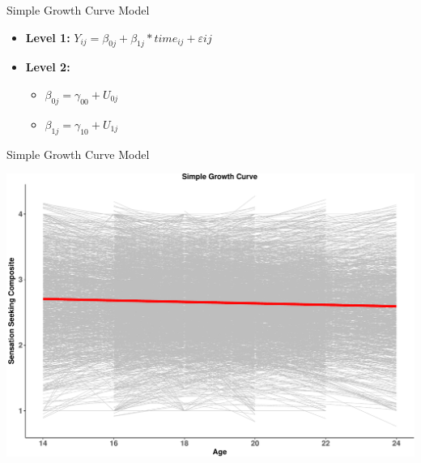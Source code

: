 \documentclass[ignorenonframetext,]{beamer}
\begin{document}
\begin{frame}{Simple Growth Curve Model}

\begin{itemize}
  \item \textbf{Level 1:} $Y_{ij} = \beta_{0j} + \beta_{1j}*time_{ij} + \varepsilon{ij}$
  \item \textbf{Level 2:} 
    \begin{itemize} 
      \item $\beta_{0j} = \gamma_{00} + U_{0j}$
      \item $\beta_{1j} = \gamma_{10} + U_{1j}$
    \end{itemize}
\end{itemize}

\end{frame}

\begin{frame}{Simple Growth Curve Model}

\includegraphics{Conditional_Models_files/figure-beamer/unnamed-chunk-3-1.pdf}

\end{frame}
\end{document}
